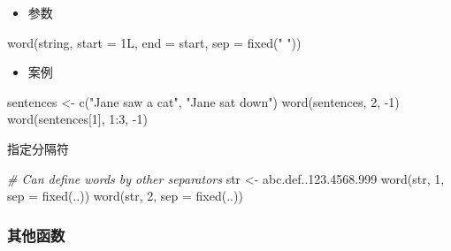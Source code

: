 \documentclass[
]{book}
\newenvironment{Shaded}{\begin{snugshade}}{\end{snugshade}}
\newcommand{\AttributeTok}[1]{\textcolor[rgb]{0.77,0.63,0.00}{#1}}
\newcommand{\CommentTok}[1]{\textcolor[rgb]{0.56,0.35,0.01}{\textit{#1}}}
\newcommand{\DecValTok}[1]{\textcolor[rgb]{0.00,0.00,0.81}{#1}}
\newcommand{\FunctionTok}[1]{\textcolor[rgb]{0.00,0.00,0.00}{#1}}
\newcommand{\NormalTok}[1]{#1}
\newcommand{\OtherTok}[1]{\textcolor[rgb]{0.56,0.35,0.01}{#1}}
\newcommand{\SpecialCharTok}[1]{\textcolor[rgb]{0.00,0.00,0.00}{#1}}
\newcommand{\StringTok}[1]{\textcolor[rgb]{0.31,0.60,0.02}{#1}}
\providecommand{\tightlist}{%
  \setlength{\itemsep}{0pt}\setlength{\parskip}{0pt}}
\begin{document}
\begin{itemize}
\tightlist
\item
  参数
\end{itemize}

\begin{Shaded}
\begin{Highlighting}[]
\FunctionTok{word}\NormalTok{(string, }\AttributeTok{start =}\NormalTok{ 1L, }\AttributeTok{end =}\NormalTok{ start, }\AttributeTok{sep =} \FunctionTok{fixed}\NormalTok{(}\StringTok{" "}\NormalTok{))}
\end{Highlighting}
\end{Shaded}

\begin{itemize}
\tightlist
\item
  案例
\end{itemize}

\begin{Shaded}
\begin{Highlighting}[]
\NormalTok{sentences }\OtherTok{\textless{}{-}} \FunctionTok{c}\NormalTok{(}\StringTok{"Jane saw a cat"}\NormalTok{, }\StringTok{"Jane sat down"}\NormalTok{)}
\FunctionTok{word}\NormalTok{(sentences, }\DecValTok{2}\NormalTok{, }\SpecialCharTok{{-}}\DecValTok{1}\NormalTok{)}
\FunctionTok{word}\NormalTok{(sentences[}\DecValTok{1}\NormalTok{], }\DecValTok{1}\SpecialCharTok{:}\DecValTok{3}\NormalTok{, }\SpecialCharTok{{-}}\DecValTok{1}\NormalTok{)}
\end{Highlighting}
\end{Shaded}

指定分隔符

\begin{Shaded}
\begin{Highlighting}[]
\CommentTok{\# Can define words by other separators}
\NormalTok{str }\OtherTok{\textless{}{-}} \StringTok{\textquotesingle{}abc.def..123.4568.999\textquotesingle{}}
\FunctionTok{word}\NormalTok{(str, }\DecValTok{1}\NormalTok{, }\AttributeTok{sep =} \FunctionTok{fixed}\NormalTok{(}\StringTok{\textquotesingle{}..\textquotesingle{}}\NormalTok{))}
\FunctionTok{word}\NormalTok{(str, }\DecValTok{2}\NormalTok{, }\AttributeTok{sep =} \FunctionTok{fixed}\NormalTok{(}\StringTok{\textquotesingle{}..\textquotesingle{}}\NormalTok{))}
\end{Highlighting}
\end{Shaded}

\hypertarget{ux5176ux4ed6ux51fdux6570}{%
\subsubsection{其他函数}\label{ux5176ux4ed6ux51fdux6570}}
\end{document}
